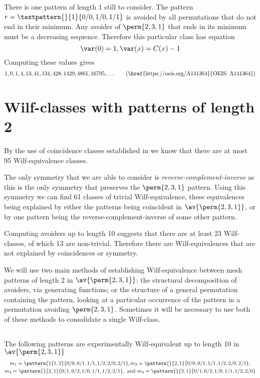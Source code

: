 \nextvar[\varmaxl]
There is one pattern of length \(1\) still to consider. The pattern
\(r = \textpattern{}{1}{0/0,1/0,1/1}\) is avoided by all permutations
that do not end in their minimum. Any avoider of \(\perm{2,3,1}\) that
ends in its minimum must be a decreasing sequence.
Therefore this particular class has equation
\begin{equation*}
    \var(0) = 1, \var(x) = C(x)-1
\end{equation*}
Computing these values gives
\begin{equation*}
    	1, 0, 1, 4, 13, 41, 131, 428, 1429, 4861, 16795,\dotsc
\tag{\href{https://oeis.org/A141364}{OEIS: A141364}}
\end{equation*}

\section{Wilf-classes with patterns of length 2}
By the use of coincidence classes established in
 we know that there are at most 95 Wilf-equivalence classes.

The only symmetry that we are able to consider is \emph{reverse-complement-inverse} as this is the only symmetry that preserves the
\(\perm{2,3,1}\) pattern. Using this symmetry we can find 61 classes of trivial
Wilf-equivalence, these equivalences being explained by either the patterns being
coincident in \(\av{\perm{2,3,1}}\), or by one pattern being the reverse-complement-inverse of some other pattern.

Computing avoiders up to length 10 suggests that there are at least 23 Wilf-classes,
of which 13 are non-trivial. Therefore there are Wilf-equivalences that are not
explained by coincidences or symmetry.

We will use two main methods of establishing Wilf-equivalence between mesh patterns of length \(2\)
in \(\av{\perm{2,3,1}}\): the structural decomposition of avoiders, via generating functions; or the
structure of a general permutation containing the pattern, looking at a particular occurrence of the
pattern in a permutation avoiding \(\perm{2,3,1}\). Sometimes it will be necessary to use both of
these methods to consolidate a single Wilf-class.

\subsection{}
\nextvar
The following patterns are experimentally Wilf-equivalent up to length 10 in
\(\av{\perm{2,3,1}}\)
\begin{gather}
    m_1 = \pattern{}{1,2}{0/0,0/1,1/1,1/2,2/0,2/1},
    m_2 = \pattern{}{2,1}{0/0,0/1,1/1,1/2,2/0,2/1}, \label{eq:singleud}\\
    m_3 = \pattern{}{2,1}{0/1,0/2,1/0,1/1,1/2,2/1}, \text{ and }
    m_4 = \pattern{}{2,1}{0/1,0/2,1/0,1/1,1/2,2/0} \label{eq:other}
\end{gather}

